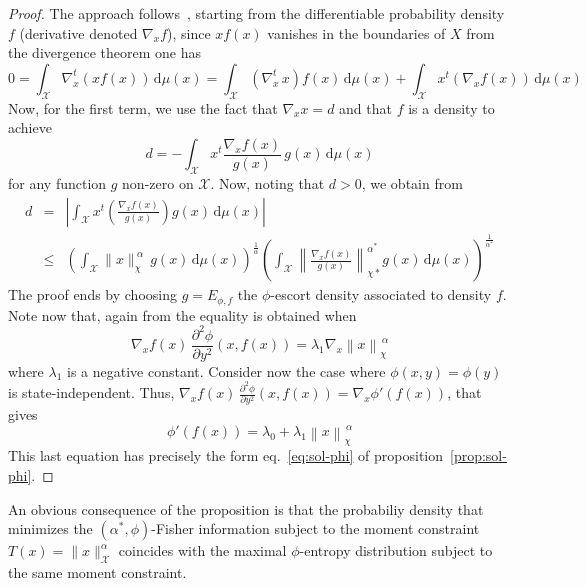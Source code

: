 \documentclass[entropy,article,submit,moreauthors,pdftex]{Definitions/mdpi}
\newcommand{\SZ}[1]{{\color{blue} #1}}
\def\dmu{\mathrm{d}\mu}
\def\X{\mathcal{X}}
\begin{document}
\begin{proof}
  The   approach   follows~\cite{Ber13},   starting  from   the   differentiable
  probability  density $f$  (derivative denoted  $\nabla_x f$),  since $x  f(x)$
  vanishes in the boundaries of $X$ from the divergence theorem one has
  \[
  0  = \int_\X  \nabla_x^t \left(  x f(x)  \right) \,  \dmu(x) =  \int_\X \left(
  \nabla_x^t \,  x \right) f(x)  \, \dmu(x) +  \int_\X x^t \left(  \nabla_x f(x)
  \right) \, \dmu(x)
  \]
  Now, for the first term, we use the fact that $\nabla_x x = d$ and that $f$ is
  a density to achieve
  \[
  d = - \int_\X x^t \frac{\nabla_x f(x)}{g(x)} \, g(x) \, \dmu(x)
  \]
  for any function  $g$ non-zero on $\X$.   Now, noting that $d >  0$, we obtain
  from \cite[Lemma~2]{Ber13}
  \SZ{
  \begin{eqnarray*}
  d  & = & \left|  \int_\X x^t  \left(  \frac{\nabla_x f(x)}{g(x)}  \right) g(x)  \,
  \dmu(x) \right|
  \\[2.5mm]
  & \le &  \left( \int_\X \|x\|_\chi^{\: \alpha} \,  g(x) \, \dmu(x)
  \right)^{\frac{1}{\alpha}}     \left(    \int_\X     \left\|    \frac{\nabla_x
    f(x)}{g(x)}\right\|_{\chi*}^{\alpha^*}        g(x)         \,        \dmu(x)
  \right)^{\frac{1}{\alpha^*}}
  \end{eqnarray*}
  }
  The  proof  ends  by  choosing  $g =  E_{\phi,f}$  the  $\phi$-escort  density
  associated to density $f$. Note now that, again from \cite[Lemma~2]{Ber13} the
  equality is obtained when
  \[
  \nabla_x  f(x) \,  \frac{\partial^2 \phi}{\partial  y^2} (x,f(x))  = \lambda_1
  \nabla_x \left\| x \right\|_\chi^{\, \alpha}
  \]
  where  $\lambda_1$  is a  negative  constant.   Consider  now the  case  where
  $\phi(x,y)  =   \phi(y)$  is  state-independent.   Thus,   $\nabla_x  f(x)  \,
  \frac{\partial^2 \phi}{\partial  y^2} (x,f(x))  = \nabla_x  \phi'(f(x))$, that
  gives
  \[
  \phi'(f(x)) = \lambda_0 + \lambda_1 \left\| x \right\|_\chi^{\, \alpha}
  \]
  This  last   equation  has   precisely  the  form   eq.~\eqref{eq:sol-phi}  of
  proposition~\ref{prop:sol-phi}.
\end{proof}
%
An obvious  consequence of the proposition  is that the probabiliy  density that
minimizes  the  $(\alpha^*,\phi)$-Fisher  information   subject  to  the  moment
constraint $T(x)  = \|x\|_\X^\alpha$  coincides with the  maximal $\phi$-entropy
distribution subject to the same moment constraint.
\end{document}
